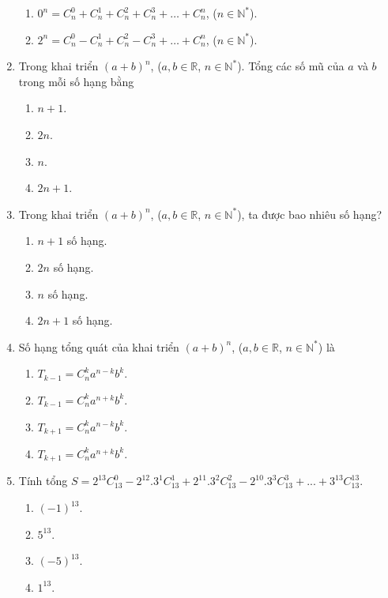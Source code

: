 \begin{enumerate}[label=\textbf{Câu \arabic*.},align=left,left=0cm..0cm,itemindent=*]
\begin{enumerate}[label=\textbf{\Alph*.},align=left,left=1cm..0cm,itemindent=*]
		\item $0^n=C_n^0+C_n^1+C_n^2+C_n^3+\ldots+C_n^n$, ($n\in\mathbb{N}^{*}$).
		\item $2^n=C_n^0-C_n^1+C_n^2-C_n^3+\ldots+C_n^n$, ($n\in\mathbb{N}^{*}$).
	\end{enumerate}
	\item Trong khai triển $(a+b)^n$, ($a,b\in\mathbb{R}$, $n\in\mathbb{N}^{*}$). Tổng các số mũ của $a$ và $b$ trong mỗi số hạng bằng
	\begin{multicols}{4}\begin{enumerate}[label=\textbf{\Alph*.},align=left,left=1cm..0cm,itemindent=*]
		\item $n+1$. \item $2n$. \item $n$. \item $2n+1$.
	\end{enumerate}\end{multicols}
	\item Trong khai triển $(a+b)^n$, ($a,b\in\mathbb{R}$, $n\in\mathbb{N}^{*}$), ta được bao nhiêu số hạng?
	\begin{enumerate}[label=\textbf{\Alph*.},align=left,left=1cm..0cm,itemindent=*]
		\item $n+1$ số hạng. \item $2n$ số hạng. \item $n$ số hạng. \item $2n+1$ số hạng.
	\end{enumerate}
	\item Số hạng tổng quát của khai triển $(a+b)^n$, ($a,b\in\mathbb{R}$, $n\in\mathbb{N}^{*}$) là
	\begin{enumerate}[label=\textbf{\Alph*.},align=left,left=1cm..0cm,itemindent=*]
		\item $T_{k-1}=C_n^ka^{n-k}b^k$. \item $T_{k-1}=C_n^ka^{n+k}b^k$. \item $T_{k+1}=C_n^ka^{n-k}b^k$. \item $T_{k+1}=C_n^ka^{n+k}b^k$.
	\end{enumerate}
	\item Tính tổng $S=2^{13}C_{13}^0-2^{12}.3^1C_{13}^1+2^{11}.3^2C_{13}^2-2^{10}.3^3C_{13}^3+...+3^{13}C_{13}^{13}$.
	\begin{multicols}{4}\begin{enumerate}[label=\textbf{\Alph*.},align=left,left=1cm..0cm,itemindent=*]
		\item $(-1)^{13}$. \item $5^{13}$. \item $(-5)^{13}$. \item $1^{13}$.

\end{enumerate}
\end{multicols}
\end{enumerate}
